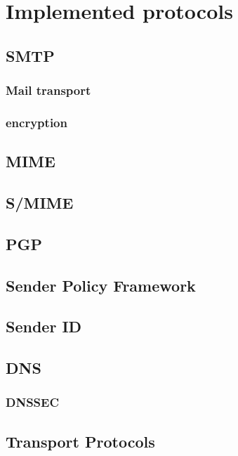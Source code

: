 \documentclass[11pt,a4paper]{book}
\begin{document}
\section{Implemented protocols}
\subsection{SMTP}
\cite{RFC5321}
\subsubsection{Mail transport}
\cite{RFC1870}
\subsubsection{encryption}

\subsection{MIME}
\cite{RFC2045}
\cite{RFC2046}
\cite{RFC2047}
\cite{RFC2048}
\cite{RFC2049}

\subsection{S/MIME}
\cite{RFC3851}

\subsection{PGP}
\cite{RFC2440}

\subsection{Sender Policy Framework}
\cite{RFC4408}
\cite{RFC6652}

\subsection{Sender ID}
\cite{RFC4401}

\subsection{DNS}
\cite{RFC2929}
\subsubsection{DNSSEC}
\cite{RFC5155}

\subsection{Transport Protocols}
\end{document}
